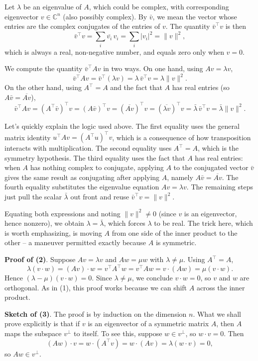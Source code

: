 \documentclass{article}
\begin{document}
Let $\lambda$ be an eigenvalue of $A$, which could be complex, with corresponding eigenvector $v \in \mathbb{C}^n$ (also possibly complex). By $\bar v$, we mean the vector whose entries are the complex conjugates of the entries of $v$. The quantity $\bar v^\top v$ is then
$$\bar v^\top v = \sum_i \overline{v_i}\, v_i = \sum_i |v_i|^2 = \|v\|^2,$$
which is always a real, non-negative number, and equals zero only when $v = 0$.
 
We compute the quantity $\bar{v}^\top A v$ in two ways. On one hand, using $Av = \lambda v$,
$$\bar{v}^\top A v = \bar{v}^\top (\lambda v) = \lambda \, \bar{v}^\top v = \lambda \|v\|^2.$$
On the other hand, using $A^\top = A$ and the fact that $A$ has real entries (so $A\bar v = \overline{Av}$),
$$\bar{v}^\top A v = (A^\top \bar{v})^\top v = (A\bar{v})^\top v = (\overline{Av})^\top v = (\overline{\lambda v})^\top v = \bar\lambda \, \bar{v}^\top v = \bar\lambda \|v\|^2.$$

\noindent Let's quickly explain the logic used above. The first equality uses the general matrix identity $u^\top A v = (A^\top u)^\top v$, which is a consequence of how transposition interacts with multiplication. The second equality uses $A^\top = A$, which is the symmetry hypothesis. The third equality uses the fact that $A$ has real entries: when $A$ has nothing complex to conjugate, applying $A$ to the conjugated vector $\bar v$ gives the same result as conjugating after applying $A$, namely $A \bar v = \overline{A v}$. The fourth equality substitutes the eigenvalue equation $A v = \lambda v$. The remaining steps just pull the scalar $\bar\lambda$ out front and reuse $\bar v^\top v = \|v\|^2$.

Equating both expressions and noting $\|v\|^2 \neq 0$ (since $v$ is an eigenvector, hence nonzero), we obtain $\lambda = \bar\lambda$, which forces $\lambda$ to be real. The trick here, which is worth emphasizing, is moving $A$ from one side of the inner product to the other -- a maneuver permitted exactly because $A$ is symmetric.
 
\textbf{Proof of (2)}. Suppose $Av = \lambda v$ and $Aw = \mu w$ with $\lambda \neq \mu$. Using $A^\top = A$,
$$\lambda(v \cdot w) = (Av) \cdot w = v^\top A^\top w = v^\top A w = v \cdot (Aw) = \mu(v \cdot w).$$
Hence $(\lambda - \mu)(v \cdot w) = 0$. Since $\lambda \neq \mu$, we conclude $v \cdot w = 0$, so $v$ and $w$ are orthogonal. As in (1), this proof works because we can shift $A$ across the inner product.
 
\textbf{Sketch of (3)}. The proof is by induction on the dimension $n$. What we shall prove explicitly is that if $v$ is an eigenvector of a symmetric matrix $A$, then $A$ maps the subspace $v^\perp$ to itself. To see this, suppose $w \in v^\perp$, so $w \cdot v = 0$. Then
$$(Aw) \cdot v = w \cdot (A^\top v) = w \cdot (Av) = \lambda(w \cdot v) = 0,$$
so $Aw \in v^\perp$. 
\end{document}
